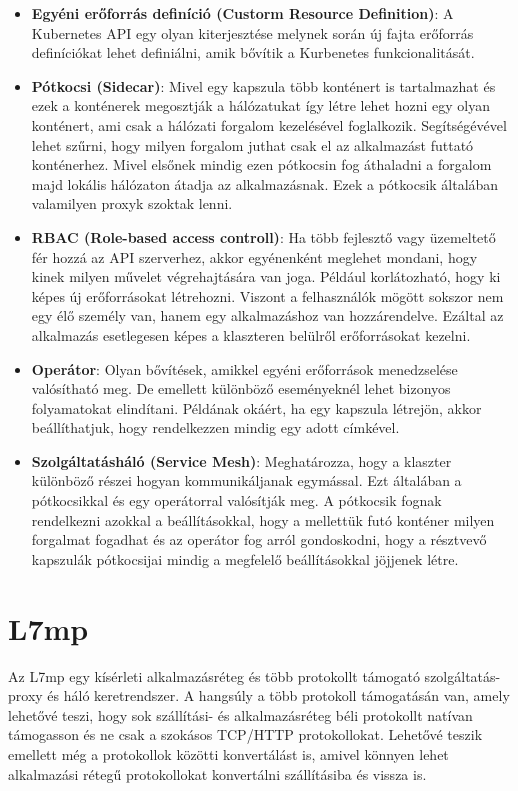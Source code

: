 \begin{itemize}
	\item \textbf{Egyéni erőforrás definíció (Custorm Resource Definition)}: A 
	Kubernetes API egy olyan kiterjesztése melynek során új fajta erőforrás definíciókat
	lehet definiálni, amik bővítik a Kurbenetes funkcionalitását.
	\item \textbf{Pótkocsi (Sidecar)}: Mivel egy kapszula több konténert is tartalmazhat
	és ezek a konténerek megosztják a hálózatukat így létre lehet hozni egy olyan 
	konténert, ami csak a hálózati forgalom kezelésével foglalkozik. Segítségévével lehet 
	szűrni, hogy milyen forgalom juthat csak el az alkalmazást futtató konténerhez. Mivel 
	elsőnek  mindig ezen pótkocsin fog áthaladni a forgalom majd lokális hálózaton átadja 
	az alkalmazásnak. Ezek a pótkocsik általában valamilyen proxyk szoktak lenni. 
	\item \textbf{RBAC (Role-based access controll)}: Ha több fejlesztő vagy üzemeltető
	fér hozzá az API szerverhez, akkor egyénenként meglehet mondani, hogy kinek milyen 
	művelet végrehajtására van joga. Például korlátozható, hogy ki képes új
	erőforrásokat létrehozni. Viszont a felhasználók mögött sokszor nem egy élő 
	személy van, hanem egy alkalmazáshoz van hozzárendelve. Ezáltal az alkalmazás 
	esetlegesen képes a klaszteren belülről erőforrásokat kezelni.
	\item \textbf{Operátor}: Olyan bővítések, amikkel egyéni erőforrások menedzselése
	valósítható meg. De emellett különböző eseményeknél lehet bizonyos folyamatokat 
	elindítani. Példának okáért, ha egy kapszula létrejön, akkor beállíthatjuk, hogy
	rendelkezzen mindig egy adott címkével.
	\item \textbf{Szolgáltatásháló (Service Mesh)}: Meghatározza, hogy a klaszter 
	különböző részei hogyan kommunikáljanak egymással. Ezt általában a pótkocsikkal és 
	egy operátorral valósítják meg. A pótkocsik fognak rendelkezni azokkal a 
	beállításokkal, hogy a mellettük futó konténer milyen forgalmat fogadhat és az 
	operátor fog arról gondoskodni, hogy a résztvevő kapszulák pótkocsijai mindig a 
	megfelelő beállításokkal jöjjenek létre.
\end{itemize}

\section{L7mp}

Az L7mp egy kísérleti alkalmazásréteg és több protokollt támogató szolgáltatás- proxy és 
háló keretrendszer. A hangsúly a több protokoll támogatásán van, amely lehetővé teszi, 
hogy sok szállítási- és alkalmazásréteg béli protokollt natívan támogasson és ne csak a 
szokásos TCP/HTTP protokollokat. Lehetővé teszik emellett még a protokollok közötti 
konvertálást is, amivel könnyen lehet alkalmazási rétegű protokollokat konvertálni 
szállításiba és vissza is.

